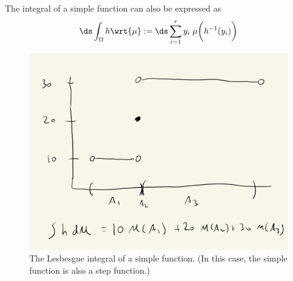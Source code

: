 \documentclass{article} %
\begin{document}
The integral of a simple function can also be expressed as 
\[\ds\int_{\Omega} h \wrt{\mu} := \ds\sum_{i=1}^r y_i \; \mu \bigg( h^{-1}(y_i) \bigg) \]

\begin{figure}[H]
\centering 
\includegraphics[width=.5\textwidth]{images/integral_of_simple_function}	
\caption{The Lesbesgue integral of a simple function. {\scriptsize (In this case, the simple function is also a step function.)}}
\end{figure}
\end{document}
